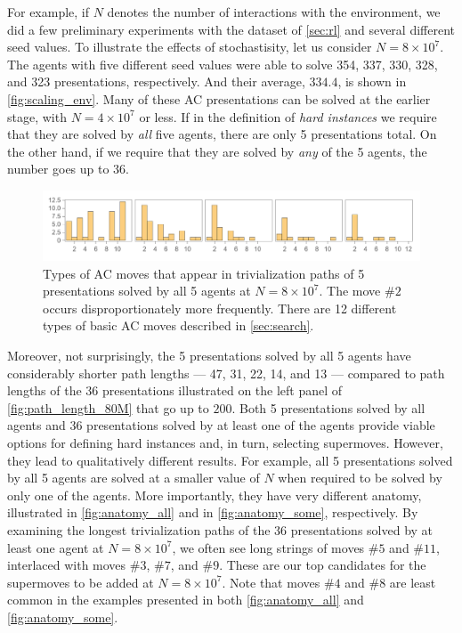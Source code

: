 For example, if $N$ denotes the number of interactions with the environment, we did a few preliminary experiments with the dataset of \autoref{sec:rl} and several different seed values. To illustrate the effects of stochastisity, let us consider $N=8 \times 10^7$. The agents with five different seed values were able to solve 354, 337, 330, 328, and 323 presentations, respectively. And their average, $334.4$, is shown in \autoref{fig:scaling_env}. Many of these AC presentations can be solved at the earlier stage, with $N=4 \times 10^7$ or less. If in the definition of \textit{hard instances} we require that they are solved by \textit{all} five agents, there are only 5 presentations total. On the other hand, if we require that they are solved by \textit{any} of the 5 agents, the number goes up to 36.

\begin{figure}[h]
    \centering
	\includegraphics[scale=0.6]{fig/anatomy_all.png}
	\caption{Types of AC moves that appear in trivialization paths of 5 presentations solved by all 5 agents at $N=8 \times 10^7$. The move $\# 2$ occurs disproportionately more frequently. There are 12 different types of basic AC moves described in \autoref{sec:search}.}
	\label{fig:anatomy_all}
\end{figure}

Moreover, not surprisingly, the 5 presentations solved by all 5 agents have considerably shorter path lengths --- 47, 31, 22, 14, and 13 --- compared to path lengths of the 36 presentations illustrated on the left panel of \autoref{fig:path_length_80M} that go up to $200$. Both 5 presentations solved by all agents and 36 presentations solved by at least one of the agents provide viable options for defining hard instances and, in turn, selecting supermoves. However, they lead to qualitatively different results. For example, all 5 presentations solved by all 5 agents are solved at a smaller value of $N$ when required to be solved by only one of the agents. More importantly, they have very different anatomy, illustrated in \autoref{fig:anatomy_all} and in \autoref{fig:anatomy_some}, respectively.
%
By examining the longest trivialization paths of the 36 presentations solved by at least one agent at $N=8 \times 10^7$, we often see long strings of moves $\# 5$ and $\# 11$, interlaced with moves $\# 3$, $\# 7$, and $\# 9$. These are our top candidates for the supermoves to be added at $N=8 \times 10^7$.
%
Note that moves $\# 4$ and $\# 8$ are least common in the examples presented in both \autoref{fig:anatomy_all} and \autoref{fig:anatomy_some}.

